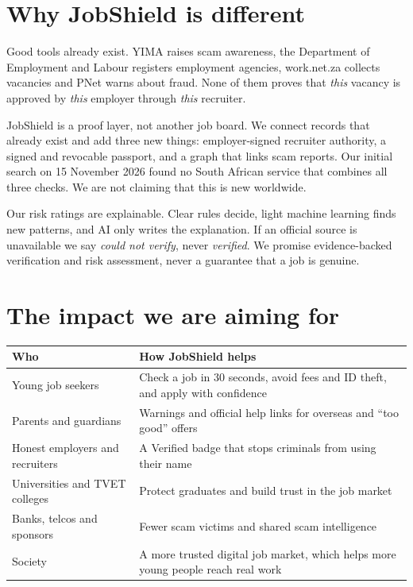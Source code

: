 \documentclass[11pt,a4paper]{article}
\newcommand{\tbl}[1]{\textbf{#1}}
\begin{document}
\section{Why JobShield is different}
Good tools already exist. YIMA raises scam awareness, the Department of Employment and Labour registers employment agencies, work.net.za collects vacancies and PNet warns about fraud. None of them proves that \emph{this} vacancy is approved by \emph{this} employer through \emph{this} recruiter.

JobShield is a proof layer, not another job board. We connect records that already exist and add three new things: employer-signed recruiter authority, a signed and revocable passport, and a graph that links scam reports. Our initial search on 15 November 2026 found no South African service that combines all three checks. We are not claiming that this is new worldwide.

Our risk ratings are explainable. Clear rules decide, light machine learning finds new patterns, and AI only writes the explanation. If an official source is unavailable we say \emph{could not verify}, never \emph{verified}. We promise evidence-backed verification and risk assessment, never a guarantee that a job is genuine.

\section{The impact we are aiming for}
\begin{center}
\begin{tabularx}{\textwidth}{@{}>{\raggedright\arraybackslash}p{3.4cm}X@{}}
\toprule
\tbl{Who} & \tbl{How JobShield helps}\\
\midrule
Young job seekers & Check a job in 30 seconds, avoid fees and ID theft, and apply with confidence\\
Parents and guardians & Warnings and official help links for overseas and ``too good'' offers\\
Honest employers and recruiters & A Verified badge that stops criminals from using their name\\
Universities and TVET colleges & Protect graduates and build trust in the job market\\
Banks, telcos and sponsors & Fewer scam victims and shared scam intelligence\\
Society & A more trusted digital job market, which helps more young people reach real work\\
\bottomrule
\end{tabularx}
\end{center}
\end{document}
